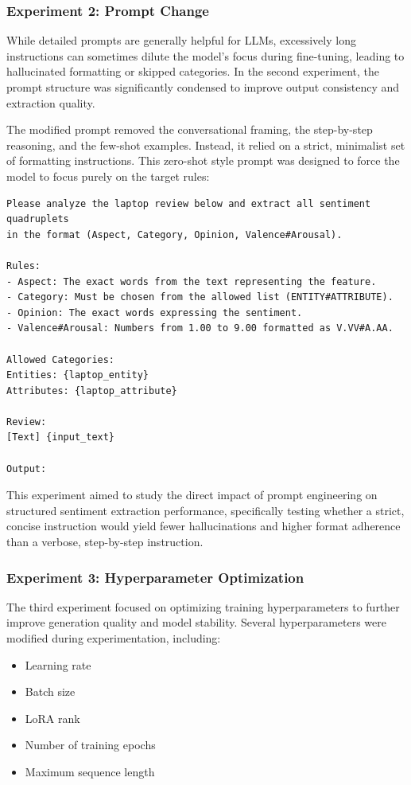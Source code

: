 \documentclass{article}
\begin{document}
\subsubsection{Experiment 2: Prompt Change}

While detailed prompts are generally helpful for LLMs, excessively long instructions can sometimes dilute the model's focus during fine-tuning, leading to hallucinated formatting or skipped categories. In the second experiment, the prompt structure was significantly condensed to improve output consistency and extraction quality.

The modified prompt removed the conversational framing, the step-by-step reasoning, and the few-shot examples. Instead, it relied on a strict, minimalist set of formatting instructions. This zero-shot style prompt was designed to force the model to focus purely on the target rules:

\begin{verbatim}
Please analyze the laptop review below and extract all sentiment quadruplets 
in the format (Aspect, Category, Opinion, Valence#Arousal).

Rules:
- Aspect: The exact words from the text representing the feature.
- Category: Must be chosen from the allowed list (ENTITY#ATTRIBUTE).
- Opinion: The exact words expressing the sentiment.
- Valence#Arousal: Numbers from 1.00 to 9.00 formatted as V.VV#A.AA.

Allowed Categories:
Entities: {laptop_entity}
Attributes: {laptop_attribute}

Review:
[Text] {input_text}

Output:
\end{verbatim}

This experiment aimed to study the direct impact of prompt engineering on structured sentiment extraction performance, specifically testing whether a strict, concise instruction would yield fewer hallucinations and higher format adherence than a verbose, step-by-step instruction.

\subsubsection{Experiment 3: Hyperparameter Optimization}

The third experiment focused on optimizing training hyperparameters to further improve generation quality and model stability. Several hyperparameters were modified during experimentation, including:
\begin{itemize}
    \item Learning rate
    \item Batch size
    \item LoRA rank
    \item Number of training epochs
    \item Maximum sequence length
\end{itemize}
\end{document}
